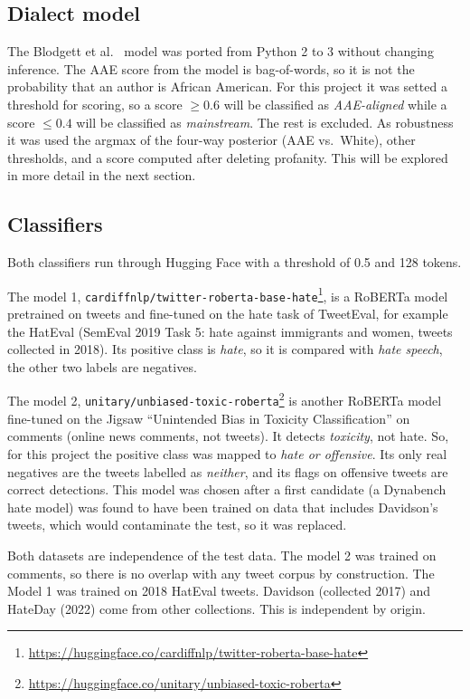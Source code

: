 \documentclass[runningheads,a4paper,oribibl]{llncs}
\newcommand{\modelone}{\texttt{cardiffnlp/}\allowbreak\texttt{twitter-}\allowbreak\texttt{roberta-}\allowbreak\texttt{base-}\allowbreak\texttt{hate}}
\newcommand{\modeltwo}{\texttt{unitary/}\allowbreak\texttt{unbiased-}\allowbreak\texttt{toxic-}\allowbreak\texttt{roberta}}
\begin{document}
\subsection{Dialect model}
The Blodgett et al.~\cite{blodgett2016} model was ported from Python 2 to 3 without changing inference.
The AAE score from the model is bag-of-words, so it is not the probability that an author is African
American. For this project it was setted a threshold for scoring, so a score $\geq0.6$ will be classified
as \emph{AAE-aligned} while a score  $\leq0.4$ will be classified as \emph{mainstream}. The rest
is excluded. As robustness it was used the argmax of the four-way posterior (AAE vs.\ White),
other thresholds, and a score computed after deleting profanity. This will be explored in more detail
in the next section.

\subsection{Classifiers}
Both classifiers run through Hugging Face with a threshold of 0.5 and 128 tokens.

The model 1, \modelone\footnote{\url{https://huggingface.co/cardiffnlp/twitter-roberta-base-hate}}, 
is a RoBERTa model pretrained on tweets and fine-tuned on the hate task of TweetEval, for example the
HatEval (SemEval 2019 Task 5: hate against immigrants and women, tweets collected in 2018). Its positive
class is \emph{hate}, so it is compared with \emph{hate speech}, the other two labels are negatives.

The model 2, \modeltwo\footnote{\url{https://huggingface.co/unitary/unbiased-toxic-roberta}}
is another RoBERTa model fine-tuned on the Jigsaw ``Unintended Bias in Toxicity Classification''
on comments (online news comments, not tweets). It detects \emph{toxicity}, not hate.
So, for this project the positive class was mapped to \emph{hate or offensive}. Its only real
negatives are the tweets labelled as \emph{neither}, and its flags on offensive tweets
are correct detections. This model was chosen after a first candidate (a Dynabench hate model)
was found to have been trained on data that includes Davidson's tweets, which would contaminate
the test, so it was replaced.

Both datasets are independence of the test data. The model 2 was trained on comments, so there
is no overlap with any tweet corpus by construction. The Model 1 was trained on 2018 HatEval
tweets. Davidson (collected 2017) and HateDay (2022) come from other collections. This is
independent by origin.
\end{document}
